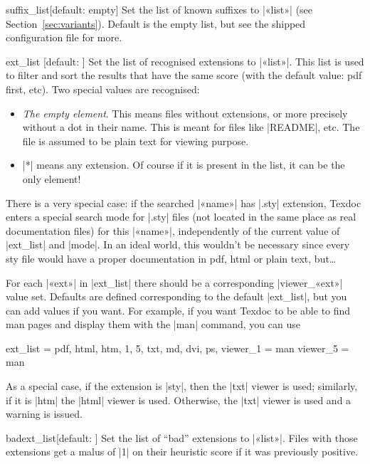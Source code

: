 \documentclass[draft]{texdoc-doc}
\begin{document}
\begin{confitem}{suffix\_list}{}[default: empty]
Set the list of known suffixes to |«list»| (see Section~\ref{sec:variants}).
Default is the empty list, but see the shipped configuration file for more.
\end{confitem}

\begin{confitem}{ext\_list}
  {}[default: ]
Set the list of recognised extensions to |«list»|. This list is used to filter
and  sort the results that have the same score (with the default value: pdf
first, etc). Two special values are recognised:
%
\begin{itemize}
\item \emph{The empty element}. This means files without extensions, or more
  precisely without a dot in their name. This is meant for files like
  |README|, etc. The file is assumed to be plain text for viewing purpose.
\item |*| means any extension. Of course if it is present in the list, it
  can be the only element!
\end{itemize}

There is a very special case: if the searched |«name»| has |.sty| extension,
Texdoc enters a special search mode for |.sty| files (not located in the same
place as real documentation files) for this |«name»|, independently of the
current value of |ext_list| and |mode|. In an ideal world, this wouldn't be
necessary since every sty file would have a proper documentation in pdf, html
or plain text, but\dots

For each |«ext»| in |ext_list| there should be a corresponding |viewer_«ext»|
value set. Defaults are defined corresponding to the default |ext_list|, but
you can add values if you want. For example, if you want Texdoc to be able
to find man pages and display them with the |man| command, you can use
%
\begin{htcode}
ext_list = pdf, html, htm, 1, 5, txt, md, dvi, ps,
viewer_1 = man
viewer_5 = man
\end{htcode}

As a special case, if the extension is |sty|, then the |txt| viewer is used;
similarly, if it is |htm| the |html| viewer is used. Otherwise, the |txt|
viewer is used and a warning is issued.
\end{confitem}

\begin{confitem}{badext\_list}{}[default: ]
Set the list of ``bad'' extensions to |«list»|. Files with those extensions get
a malus of |1| on their heuristic score if it was previously positive.
\end{confitem}
\end{document}
